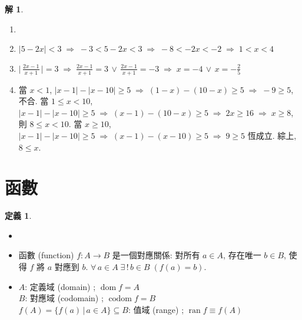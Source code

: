 \documentclass[12pt,a4paper]{extarticle}
\newcommand{\ds}{\displaystyle}
\newcommand{\ie}{\;\Longrightarrow\;}
\DeclareMathOperator*{\dom}{dom}
\DeclareMathOperator*{\codom}{codom}
\DeclareMathOperator*{\ran}{ran}
\theoremstyle{definition}
\newtheorem*{dfn}{定義}
\newtheorem*{sol}{解}
\begin{document}
\begin{sol}
  \begin{enumerate}\setlength\itemsep{0em}
    \item[]
    \item $\ds |5 - 2x| < 3 \ie -3 < 5 - 2x < 3 \ie -8 < -2x < -2 \ie 1 < x < 4$
    \item $\ds \Big|\,\frac{2 x - 1}{x + 1}\,\Big| = 3 \ie \frac{2 x - 1}{x + 1} = 3\,\vee\,\frac{2 x - 1}{x + 1} = -3 \ie x = -4 \,\vee\, x = -\frac{2}{5}$
    \item 當 $x < 1$, $\ds |x - 1| - |x - 10|\geqslant 5 \ie (1 - x) - (10 - x)\geqslant 5 \ie -9 \geqslant 5$, 不合. 當 $1\leqslant x < 10$, $\ds |x - 1| - |x - 10|\geqslant 5 \ie (x - 1) - (10 - x)\geqslant 5 \ie 2 x\geqslant 16 \ie x\geqslant 8$, 則 $8\leqslant x < 10$. 當 $x\geqslant 10$, $\ds |x - 1| - |x - 10|\geqslant 5 \ie (x - 1) - (x - 10)\geqslant 5 \ie 9\geqslant 5$ 恆成立. 綜上, $8\leqslant x$. 
  \end{enumerate}
\end{sol}

\section*{函數}

\begin{dfn}
  \begin{itemize}\setlength\itemsep{0em}
    \item[]
    \item 函數 (function) $f:A\to B$ 是一個對應關係: 對所有 $a\in A$, 存在唯一 $b\in B$, 使得 $f$ 將 $a$ 對應到 $b$. $\ds\forall\,a\in A\;\exists\,!\,b\in B\;(f(a) = b)$.
    \item $A$:  定義域 (domain) ;  $\dom f = A$ \\
          $B$:  對應域 (codomain) ;  $\codom f = B$ \\
          $f(A) = \{f(a)\,|\,a\in A\}\subseteq B$: 值域 (range) ; $\ran f \equiv f(A)$      
  \end{itemize}
\end{dfn}
\end{document}
